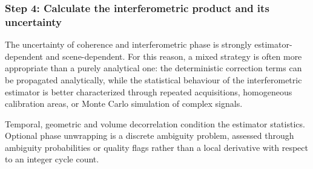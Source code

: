 
\subsubsection{Step 4: Calculate the interferometric product and its uncertainty}

The uncertainty of coherence and interferometric phase is strongly estimator-
dependent and scene-dependent. For this reason, a mixed strategy is often more
appropriate than a purely analytical one: the deterministic correction terms
can be propagated analytically, while the statistical behaviour of the
interferometric estimator is better characterized through repeated acquisitions,
homogeneous calibration areas, or Monte Carlo simulation of complex signals.

Temporal, geometric and volume decorrelation condition the estimator statistics. Optional phase unwrapping is a discrete ambiguity problem, assessed through
ambiguity probabilities or quality flags rather than a local derivative with respect to an integer
cycle count.

